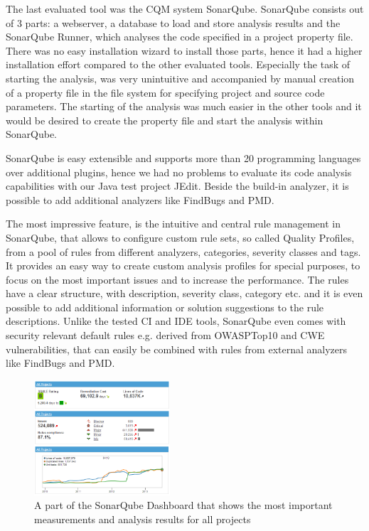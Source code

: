 \documentclass[conference]{IEEEtran}
\begin{document}
The last evaluated tool was the CQM system SonarQube.
SonarQube consists out of 3 parts: a webserver, a database to load and store analysis results and the SonarQube Runner, which analyses the code specified in a project property file.
There was no easy installation wizard to install those parts, hence it had a higher installation effort compared to the other evaluated tools.
Especially the task of starting the analysis, was very unintuitive and accompanied by manual creation of a property file in the file system for specifying project and source code parameters.
The starting of the analysis was much easier in the other tools and it would be desired to create the property file and start the analysis within SonarQube.


SonarQube is easy extensible and supports more than 20 programming languages over additional plugins, hence we had no problems to evaluate its code analysis capabilities with our Java test project JEdit.
Beside the build-in analyzer, it is possible to add additional analyzers like FindBugs and PMD.


The most impressive feature, is the intuitive and central rule management in SonarQube, that allows to configure custom rule sets, so called Quality Profiles, from a pool of rules from different analyzers, categories, severity classes and tags.
It provides an easy way to create custom analysis profiles for special purposes, to focus on the most important issues and to increase the performance.
The rules have a clear structure, with description, severity class, category etc. and it is even possible to add additional information or solution suggestions to the rule descriptions.
Unlike the tested CI and IDE tools, SonarQube even comes with security relevant default rules e.g. derived from OWASPTop10 and CWE vulnerabilities, that can easily be combined with rules from external analyzers like FindBugs and PMD.


\begin{figure}[t]
	\centering
	\includegraphics[width=0.45\textwidth]{img/Sonarqube.png}
	\caption{A part of the SonarQube Dashboard that shows the most important measurements and analysis results for all projects}
	\label{fig:sonarqube-dashboard}
\end{figure}
\end{document}
